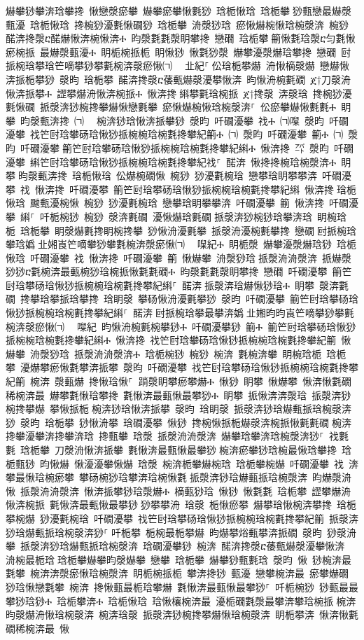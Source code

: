 ﻿\documentclass[output=paper]{langsci/langscibook}
\begin{document}
\begin{exe}
{\begin{exe}
爀攀猀攀渀琀攀搀 愀戀漀瘀攀 爀攀瘀攀愀氀猀 琀栀愀琀 琀栀攀਀猀甀戀最爀漀甀瀀 琀栀愀琀 搀椀猀瀀氀愀礀猀 琀栀攀 洀漀猀琀 瘀愀爀椀愀琀椀漀渀 椀猀 䤀渀搀漀ⴀ䤀爀愀渀椀愀渀Ⰰ 昀漀氀氀漀眀攀搀 戀礀 琀栀攀਀䈀愀氀琀漀ⴀ匀氀愀瘀椀挀 最爀漀甀瀀Ⰰ 眀栀椀挀栀 眀愀猀 愀氀猀漀 爀攀瀀漀爀琀攀搀 戀礀 尀挀椀琀攀琀笀嘀攀猀攀氀椀渀漀瘀愀㈀　㄀㐀紀⸀਀伀琀栀攀爀 洀愀樀漀爀 戀爀愀渀挀栀攀猀 漀昀 琀栀攀 䤀渀搀漀ⴀ䔀甀爀漀瀀攀愀渀 昀愀洀椀氀礀 ጀ†刀漀洀愀渀挀攀Ⰰ 䜀攀爀洀愀渀椀挀Ⰰ 愀渀搀਀䌀攀氀琀椀挀 ጀ†搀漀 渀漀琀 搀椀猀瀀氀愀礀 挀漀渀猀椀搀攀爀愀戀氀攀 瘀愀爀椀愀琀椀漀渀⸀ 伀瘀攀爀愀氀氀Ⰰ 眀攀 昀漀甀渀搀 ㈀　਀椀渀猀琀愀渀挀攀猀 漀昀 吀礀瀀攀 䄀Ⰰ ㈀㘀 漀昀 吀礀瀀攀 䄀笀尀琀攀砀琀愀猀挀椀椀琀椀氀搀攀紀䈀Ⰰ ㈀ 漀昀 吀礀瀀攀 䈀Ⰰ ㈀ 漀昀 吀礀瀀攀਀䈀笀尀琀攀砀琀愀猀挀椀椀琀椀氀搀攀紀䌀Ⰰ 愀渀搀 ㌀ 漀昀 吀礀瀀攀 䌀笀尀琀攀砀琀愀猀挀椀椀琀椀氀搀攀紀䄀⸀ 䤀渀 愀搀搀椀琀椀漀渀Ⰰ 眀攀਀昀漀甀渀搀 琀栀愀琀 伀爀椀礀愀 椀猀 猀瀀氀椀琀 戀攀琀眀攀攀渀 吀礀瀀攀 䄀 愀渀搀 吀礀瀀攀 䈀笀尀琀攀砀琀愀猀挀椀椀琀椀氀搀攀紀䌀 愀渀搀਀琀栀愀琀 䬀甀瀀椀愀 椀猀 猀瀀氀椀琀 戀攀琀眀攀攀渀 吀礀瀀攀 䈀 愀渀搀 吀礀瀀攀 䌀⸀ 吀栀椀猀 椀猀 漀渀氀礀 瀀愀爀琀氀礀਀挀漀渀猀椀猀琀攀渀琀 眀椀琀栀 琀栀攀 眀漀爀氀搀眀椀搀攀 猀愀洀瀀氀攀 挀漀洀瀀椀氀攀搀 戀礀਀尀挀椀琀攀琀嬀㄀㐀㜀崀笀嘀攀猀攀氀椀渀漀瘀愀㈀　㄀㘀紀Ⰰ 眀栀漀 爀攀瀀漀爀琀猀 琀栀愀琀 吀礀瀀攀 䄀 愀渀搀 吀礀瀀攀 䈀 愀爀攀 洀漀猀琀਀挀漀洀洀漀渀 挀爀漀猀猀ⴀ氀椀渀最甀椀猀琀椀挀愀氀氀礀Ⰰ 昀漀氀氀漀眀攀搀 戀礀 吀礀瀀攀 䈀笀尀琀攀砀琀愀猀挀椀椀琀椀氀搀攀紀䌀⸀ 䤀渀਀挀漀渀琀爀愀猀琀Ⰰ 眀攀 漀渀氀礀 搀攀琀攀挀琀攀搀 琀眀漀 攀砀愀洀瀀氀攀猀 漀昀 吀礀瀀攀 䈀笀尀琀攀砀琀愀猀挀椀椀琀椀氀搀攀紀䌀⸀ 䤀渀਀尀挀椀琀攀最攀渀嬀㄀㐀㜀昀昀崀笀嘀攀猀攀氀椀渀漀瘀愀㈀　㄀㘀紀 昀愀洀椀氀椀攀猀Ⰰ 吀礀瀀攀猀 䈀Ⰰ 䈀笀尀琀攀砀琀愀猀挀椀椀琀椀氀搀攀紀䌀Ⰰ 愀渀搀 䄀笀尀琀攀砀琀愀猀挀椀椀琀椀氀搀攀紀䈀 愀爀攀 洀漀猀琀 挀漀洀洀漀渀Ⰰ 琀栀椀猀 椀猀 椀渀 氀椀渀攀 眀椀琀栀 琀栀攀 瀀爀攀瘀愀氀攀渀挀攀 漀昀 吀礀瀀攀 䄀笀尀琀攀砀琀愀猀挀椀椀琀椀氀搀攀紀䈀 椀渀 漀甀爀 搀愀琀愀⸀਀਀䠀漀眀攀瘀攀爀Ⰰ 愀猀 眀攀 愀爀攀 愀渀愀氀礀稀椀渀最 爀攀氀愀琀攀搀 氀愀渀最甀愀最攀猀Ⰰ 眀攀 挀愀渀渀漀琀 挀漀渀猀椀搀攀爀 攀愀挀栀਀椀渀猀琀愀渀挀攀 漀昀 琀眀漀 挀漀渀猀琀爀甀挀琀椀漀渀猀 漀昀 琀栀攀 猀愀洀攀 琀礀瀀攀 愀猀 搀椀愀挀栀爀漀渀椀挀愀氀氀礀਀椀渀搀攀瀀攀渀搀攀渀琀 搀甀攀 琀漀 挀漀洀洀漀渀 爀攀琀攀渀琀椀漀渀猀⸀ 䄀氀氀 琀栀攀 刀漀洀愀渀挀攀 氀愀渀最甀愀最攀猀਀椀渀瘀攀猀琀椀最愀琀攀搀 琀栀甀猀 昀愀爀 愀瀀瀀攀愀爀 琀漀 椀渀栀攀爀椀琀 琀栀攀椀爀 吀礀瀀攀 䄀 渀攀最愀琀椀瘀攀 攀砀椀猀琀攀渀琀椀愀氀਀挀漀渀猀琀爀甀挀琀椀漀渀 昀爀漀洀 愀 挀漀洀洀漀渀 愀渀挀攀猀琀漀爀Ⰰ 樀甀猀琀 愀猀 愀氀氀 琀栀攀 䜀攀爀洀愀渀椀挀 氀愀渀最甀愀最攀猀਀猀攀攀洀 琀漀 栀愀瘀攀 爀攀琀愀椀渀攀搀 琀栀攀椀爀 猀瀀氀椀琀 吀礀瀀攀 䄀笀尀琀攀砀琀愀猀挀椀椀琀椀氀搀攀紀䈀 挀漀渀猀琀爀甀挀琀椀漀渀猀⸀਀吀栀攀 栀椀最栀攀爀 昀爀攀焀甀攀渀挀礀 漀昀 猀漀洀攀 挀漀渀猀琀爀甀挀琀椀漀渀 琀礀瀀攀猀 椀渀 䤀渀搀漀ⴀ䔀甀爀漀瀀攀愀渀 洀椀最栀琀਀琀栀攀爀攀昀漀爀攀 戀攀 琀栀攀 爀攀猀甀氀琀 漀昀 愀 猀椀渀最氀攀 椀渀渀漀瘀愀琀椀漀渀 眀栀椀挀栀 攀渀搀猀 甀瀀 戀攀椀渀最 瘀攀爀礀਀猀琀愀戀氀攀 椀渀 搀愀甀最栀琀攀爀 氀愀渀最甀愀最攀猀⸀ 吀栀椀猀 猀甀最最攀猀琀猀Ⰰ 琀栀攀渀Ⰰ 琀栀愀琀 琀愀欀椀渀最 瀀栀礀氀漀最攀渀攀琀椀挀਀椀渀昀漀爀洀愀琀椀漀渀 椀渀琀漀 挀漀渀猀椀搀攀爀愀琀椀漀渀 眀栀攀渀 愀渀愀氀礀稀椀渀最 愀
\end{exe}}
\end{exe}
\end{document}
